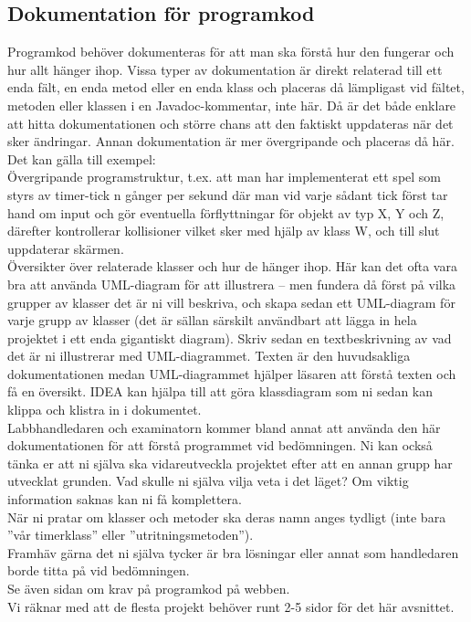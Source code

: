 \subsection{Dokumentation för programkod}
{\color{red}Programkod behöver dokumenteras för att man ska förstå hur den fungerar och hur allt hänger ihop.  Vissa typer av dokumentation är direkt relaterad till ett enda fält, en enda metod eller en enda klass och placeras då lämpligast vid fältet, metoden eller klassen i en Javadoc-kommentar, inte här.  Då är det både enklare att hitta dokumentationen och större chans att den faktiskt uppdateras när det sker ändringar.  Annan dokumentation är mer övergripande och placeras då här.  Det kan gälla till exempel:\\}
{\color{red}Övergripande programstruktur, t.ex. att man har implementerat ett spel som styrs av timer-tick n gånger per sekund där man vid varje sådant tick först tar hand om input och gör eventuella förflyttningar för objekt av typ X, Y och Z, därefter kontrollerar kollisioner vilket sker med hjälp av klass W, och till slut uppdaterar skärmen.\\}
\vspace{11pt}
{\color{red}Översikter över relaterade klasser och hur de hänger ihop.  Här kan det ofta vara bra att använda UML-diagram för att illustrera – men fundera då först på vilka grupper av klasser det är ni vill beskriva, och skapa sedan ett UML-diagram för varje grupp av klasser (det är sällan särskilt användbart att lägga in hela projektet i ett enda gigantiskt diagram).  Skriv sedan en textbeskrivning av vad det är ni illustrerar med UML-diagrammet.  Texten är den huvudsakliga dokumentationen medan UML-diagrammet hjälper läsaren att förstå texten och få en översikt.  IDEA kan hjälpa till att göra klassdiagram som ni sedan kan klippa och klistra in i dokumentet.\\}
\vspace{11pt}
{\color{red}Labbhandledaren och examinatorn kommer bland annat att använda den här dokumentationen för att förstå programmet vid bedömningen.  Ni kan också tänka er att ni själva ska vidareutveckla projektet efter att en annan grupp har utvecklat grunden.  Vad skulle ni själva vilja veta i det läget?  Om viktig information saknas kan ni få komplettera.\\}
{\color{red}När ni pratar om klasser och metoder ska deras namn anges tydligt (inte bara ”vår timerklass” eller ”utritningsmetoden”).\\}
{\color{red}Framhäv gärna det ni själva tycker är bra lösningar eller annat som handledaren borde titta på vid bedömningen.\\}
{\color{red}Se även sidan om krav på programkod på webben.\\}
{\color{red}Vi räknar med att de flesta projekt behöver runt 2-5 sidor för det här avsnittet.\\}

